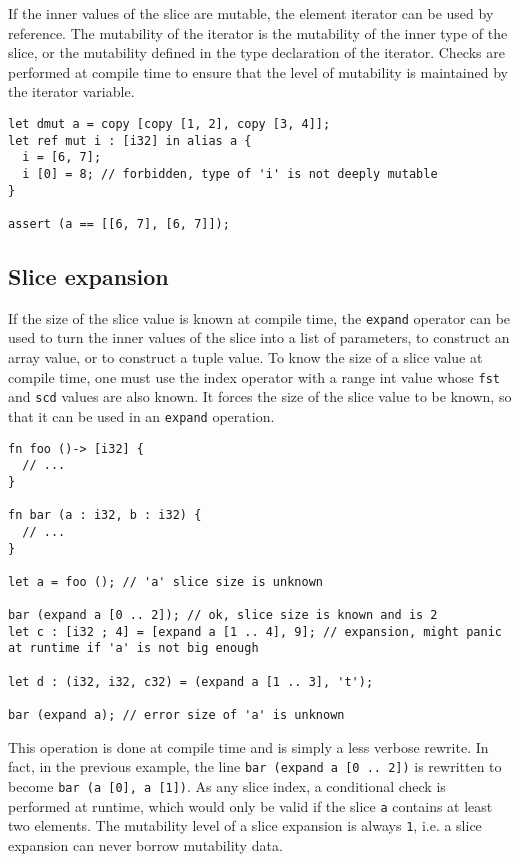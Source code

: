 If the inner values of the slice are mutable, the element iterator can be used
by reference. The mutability of the iterator is the mutability of the inner type
of the slice, or the mutability defined in the type declaration of the iterator.
Checks are performed at compile time to ensure that the level of mutability is
maintained by the iterator variable.

\begin{lstlisting}[style=coloredverbatim]
let dmut a = copy [copy [1, 2], copy [3, 4]];
let ref mut i : [i32] in alias a {
  i = [6, 7];
  i [0] = 8; // forbidden, type of 'i' is not deeply mutable
}

assert (a == [[6, 7], [6, 7]]);
\end{lstlisting}

\subsection{Slice expansion}

If the size of the slice value is known at compile time, the \texttt{expand}
operator can be used to turn the inner values of the slice into a list of
parameters, to construct an array value, or to construct a tuple value. To know
the size of a slice value at compile time, one must use the index operator with
a range int value whose \texttt{fst} and \texttt{scd} values are also known. It
forces the size of the slice value to be known, so that it can be used in an
\texttt{expand} operation.

\begin{lstlisting}[style=coloredverbatim]
fn foo ()-> [i32] {
  // ...
}

fn bar (a : i32, b : i32) {
  // ...
}

let a = foo (); // 'a' slice size is unknown

bar (expand a [0 .. 2]); // ok, slice size is known and is 2
let c : [i32 ; 4] = [expand a [1 .. 4], 9]; // expansion, might panic at runtime if 'a' is not big enough

let d : (i32, i32, c32) = (expand a [1 .. 3], 't');

bar (expand a); // error size of 'a' is unknown
  \end{lstlisting}

This operation is done at compile time and is simply a less verbose rewrite. In
fact, in the previous example, the line \texttt{bar (expand a [0 .. 2])} is rewritten to
become \texttt{bar (a [0], a [1])}. As any slice index, a conditional check is
performed at runtime, which would only be valid if the slice \texttt{a} contains
at least two elements. The mutability level of a slice expansion is always
\texttt{1}, i.e. a slice expansion can never borrow mutability data.


